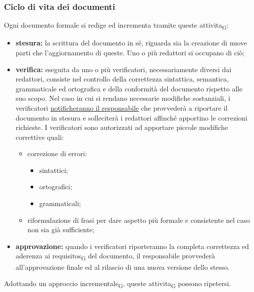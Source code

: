    \subsubsection{Ciclo di vita dei documenti}
    \label{ciclovitadoc}
    Ogni documento formale si redige ed incrementa tramite queste \gls{attivita}\textsubscript{G}:
    \begin{itemize}
        \item \textbf{stesura: }la scrittura del documento in sé, riguarda sia la creazione di nuove parti che l'aggiornamento di queste. Uno o più redattori si occupano di ciò;
        \item \textbf{verifica: }eseguita da uno o più verificatori, necessariamente diversi dai redattori, consiste nel controllo della correttezza sintattica, semantica, grammaticale ed ortografica e della conformità del documento rispetto alle suo scopo. Nel caso in cui si rendano necessarie modifiche sostanziali, i verificatori \hyperref[risoluzioneproblemi]{notificheranno il responsabile} che provvederà a riportare il documento in stesura e solleciterà i redattori affinché apportino le correzioni richieste. I verificatori sono autorizzati ad apportare piccole modifiche correttive quali:
        \begin{itemize}
            \item correzione di errori:
                \begin{itemize}
                    \item sintattici;
                    \item ortografici;
                    \item grammaticali;
                \end{itemize}

            \item riformulazione di frasi per dare aspetto più formale e consistente nel caso non sia già sufficiente;
        \end{itemize}
        \item \textbf{approvazione: }quando i verificatori riporteranno la completa correttezza ed aderenza ai \glspl{requisito}\textsubscript{G} del documento, il responsabile provvederà all'approvazione finale ed al rilascio di una nuova versione dello stesso.
    \end{itemize}
    Adottando un approccio \gls{incrementale}\textsubscript{G}, queste \gls{attivita}\textsubscript{G} possono ripetersi.
